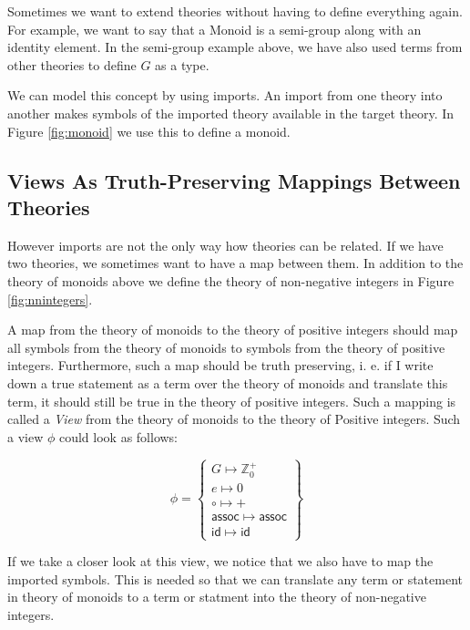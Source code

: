 Sometimes we want to extend theories without having to define everything again. For example, we want to say that a Monoid is a semi-group along with an identity element. In the semi-group example above, we have also used terms from other theories to define $G$ as a type.

We can model this concept by using imports. An import from one theory into another makes symbols of the imported theory available in the target theory. In Figure \ref{fig:monoid} we use this to define a monoid.



\subsection{Views As Truth-Preserving Mappings Between Theories}

However imports are not the only way how theories can be related. If we have two theories, we sometimes want to have a map between them. In addition to the theory of monoids above we define the theory of non-negative integers in Figure \ref{fig:nnintegers}.



A map from the theory of monoids to the theory of positive integers should map all symbols from the theory of monoids to symbols from the theory of positive integers. Furthermore, such a map should be truth preserving, i. e. if I write down a true statement as a term over the theory of monoids and translate this term, it should still be true  in the theory of positive integers. Such a mapping is called a \textit{View} from the theory of monoids to the theory of Positive integers. Such a view $\phi$ could look as follows:

\[
  \phi=\left\{\begin{array}{l}
  G \mapsto \mathbb{Z}^{+}_{0}\\
  e \mapsto 0\\
  \circ \mapsto +\\
  \mathsf{assoc} \mapsto \mathsf{assoc}\\
  \mathsf{id} \mapsto \mathsf{id}
  \end{array}\right\}
\]

If we take a closer look at this view, we notice that we also have to map the imported symbols. This is needed so that we can translate any term or statement in theory of monoids to a term or statment into the theory of non-negative integers.

